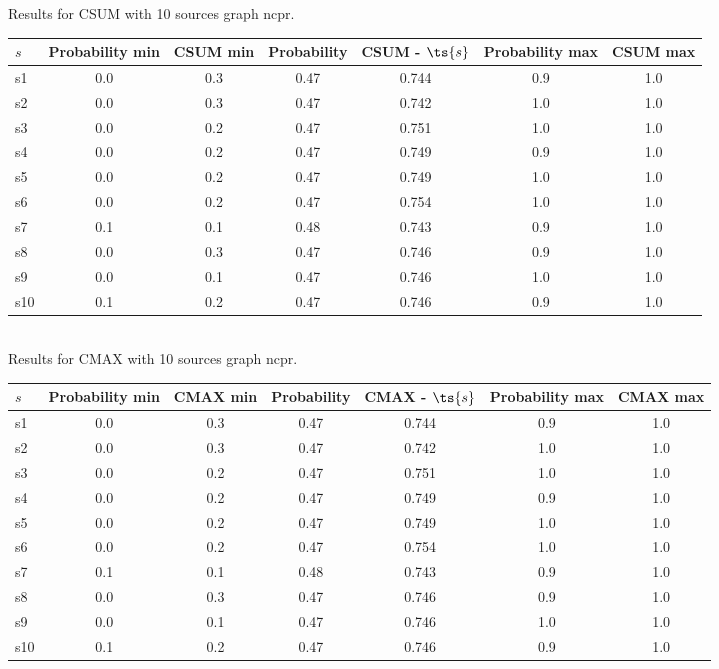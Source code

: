 \documentclass{article}
\begin{document}
\noindent Results for CSUM with 10 sources graph ncpr.

\noindent\begin{tabular}{|l|c|c|c|c|c|c|}
\hline
$s$& Probability min & CSUM min & Probability & CSUM - $\ts{s}$ & Probability max & CSUM max\\
\hline
s1 &0.0 & 0.3 & 0.47 & 0.744 & 0.9 & 1.0\\
\hline
s2 &0.0 & 0.3 & 0.47 & 0.742 & 1.0 & 1.0\\
\hline
s3 &0.0 & 0.2 & 0.47 & 0.751 & 1.0 & 1.0\\
\hline
s4 &0.0 & 0.2 & 0.47 & 0.749 & 0.9 & 1.0\\
\hline
s5 &0.0 & 0.2 & 0.47 & 0.749 & 1.0 & 1.0\\
\hline
s6 &0.0 & 0.2 & 0.47 & 0.754 & 1.0 & 1.0\\
\hline
s7 &0.1 & 0.1 & 0.48 & 0.743 & 0.9 & 1.0\\
\hline
s8 &0.0 & 0.3 & 0.47 & 0.746 & 0.9 & 1.0\\
\hline
s9 &0.0 & 0.1 & 0.47 & 0.746 & 1.0 & 1.0\\
\hline
s10 &0.1 & 0.2 & 0.47 & 0.746 & 0.9 & 1.0\\
\hline
\end{tabular}\\

\noindent Results for CMAX with 10 sources graph ncpr.

\noindent\begin{tabular}{|l|c|c|c|c|c|c|}
\hline
$s$& Probability min & CMAX min & Probability & CMAX - $\ts{s}$ & Probability max & CMAX max\\
\hline
s1 &0.0 & 0.3 & 0.47 & 0.744 & 0.9 & 1.0\\
\hline
s2 &0.0 & 0.3 & 0.47 & 0.742 & 1.0 & 1.0\\
\hline
s3 &0.0 & 0.2 & 0.47 & 0.751 & 1.0 & 1.0\\
\hline
s4 &0.0 & 0.2 & 0.47 & 0.749 & 0.9 & 1.0\\
\hline
s5 &0.0 & 0.2 & 0.47 & 0.749 & 1.0 & 1.0\\
\hline
s6 &0.0 & 0.2 & 0.47 & 0.754 & 1.0 & 1.0\\
\hline
s7 &0.1 & 0.1 & 0.48 & 0.743 & 0.9 & 1.0\\
\hline
s8 &0.0 & 0.3 & 0.47 & 0.746 & 0.9 & 1.0\\
\hline
s9 &0.0 & 0.1 & 0.47 & 0.746 & 1.0 & 1.0\\
\hline
s10 &0.1 & 0.2 & 0.47 & 0.746 & 0.9 & 1.0\\
\hline
\end{tabular}\\
\end{document}
